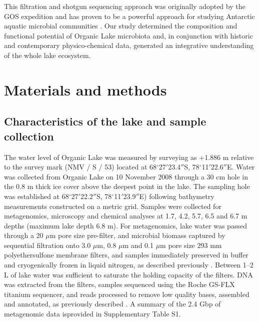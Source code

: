 This filtration and shotgun sequencing approach was originally adopted by the \ac{GOS} expedition \cite{Rusch2007} and has proven to be a powerful approach for studying Antarctic aquatic microbial communities \cite{Ng2010a, Lauro 2011, Yau2011, Brown2012, Williams2012b, Wilkins2012b}. 
Our study determined the composition and functional potential of Organic Lake microbiota and, in conjunction with historic and contemporary physico-chemical data, generated an integrative understanding of the whole lake ecosystem. 

\section{Materials and methods}
\subsection{Characteristics of the lake and sample collection}
The water level of Organic Lake was measured by surveying as $+$1.886 m relative to the survey mark (NMV / S / 53) located at 68$^{\circ}$27$'$23.4$''$S, 78$^{\circ}$11$'$22.6$''$E.
Water was collected from Organic Lake on 10 November 2008 through a 30 cm hole in the 0.8 m thick ice cover above the deepest point in the lake. 
The sampling hole was established at 68$^{\circ}$27$'$22.2$''$S, 78$^{\circ}$11$'$23.9$''$E) following bathymetry measurements constructed on a metric grid. 
Samples were collected for metagenomics, microscopy and chemical analyses at 1.7, 4.2, 5.7, 6.5 and 6.7 m depths (maximum lake depth 6.8 m).
For metagenomics, lake water was passed through a 20 $\mu$m pore size pre-filter, and microbial biomass captured by sequential filtration onto 3.0 $\mu$m, 0.8 $\mu$m and 0.1 $\mu$m pore size 293 mm polyethersulfone membrane filters, and samples immediately preserved in buffer and cryogenically frozen in liquid nitrogen, as described previously \cite{Ng2010a, Lauro2011}. 
Between 1--2 L of lake water was sufficient to saturate the holding capacity of the filters. 
\ac{DNA} was extracted from the filters, samples sequenced using the Roche GS-FLX titanium sequencer, and reads processed to remove low quality bases, assembled and annotated, as previously described \cite{Ng2010, Lauro2011}. 
A summary of the 2.4 Gbp of metagenomic data isprovided in Supplementary Table S1.


